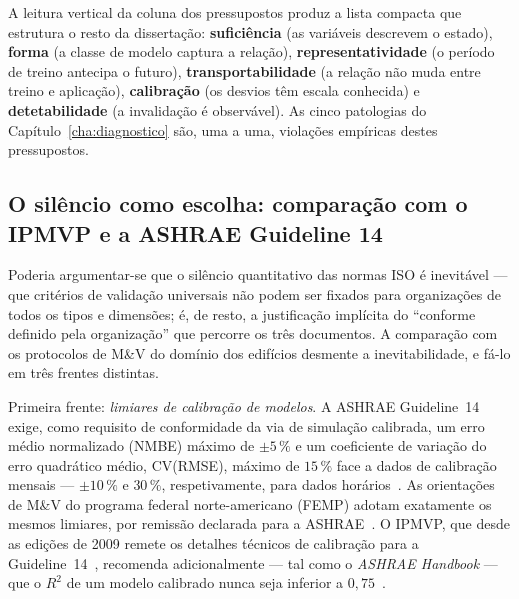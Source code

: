 A leitura vertical da coluna dos pressupostos produz a lista compacta que estrutura o resto da dissertação: \textbf{suficiência} (as variáveis descrevem o estado), \textbf{forma} (a classe de modelo captura a relação), \textbf{representatividade} (o período de treino antecipa o futuro), \textbf{transportabilidade} (a relação não muda entre treino e aplicação), \textbf{calibração} (os desvios têm escala conhecida) e \textbf{detetabilidade} (a invalidação é observável). As cinco patologias do Capítulo~\ref{cha:diagnostico} são, uma a uma, violações empíricas destes pressupostos.

\subsection{O silêncio como escolha: comparação com o IPMVP e a ASHRAE Guideline 14}
\label{sec:assimetria-comparacao}

Poderia argumentar-se que o silêncio quantitativo das normas ISO é inevitável --- que critérios de validação universais não podem ser fixados para organizações de todos os tipos e dimensões; é, de resto, a justificação implícita do \enquote{conforme definido pela organização} que percorre os três documentos. A comparação com os protocolos de M\&V do domínio dos edifícios desmente a inevitabilidade, e fá-lo em três frentes distintas.

Primeira frente: \emph{limiares de calibração de modelos}. A ASHRAE Guideline~14 exige, como requisito de conformidade da via de simulação calibrada, um erro médio normalizado (NMBE) máximo de $\pm 5\,\%$ e um coeficiente de variação do erro quadrático médio, CV(RMSE), máximo de $15\,\%$ face a dados de calibração mensais --- $\pm 10\,\%$ e $30\,\%$, respetivamente, para dados horários~\cite[\S4.3.2.4\,f), \S5.3.3.3.10]{ASHRAE14_2014}. As orientações de M\&V do programa federal norte-americano (FEMP) adotam exatamente os mesmos limiares, por remissão declarada para a ASHRAE~\cite[\S4.5.3.2, Tabela~4-2]{FEMP_2015}. O IPMVP, que desde as edições de 2009 remete os detalhes técnicos de calibração para a Guideline~14~\cite{RuizBandera2017}, recomenda adicionalmente --- tal como o \emph{ASHRAE Handbook} --- que o $R^2$ de um modelo calibrado nunca seja inferior a $0{,}75$~\cite{RuizBandera2017}.

